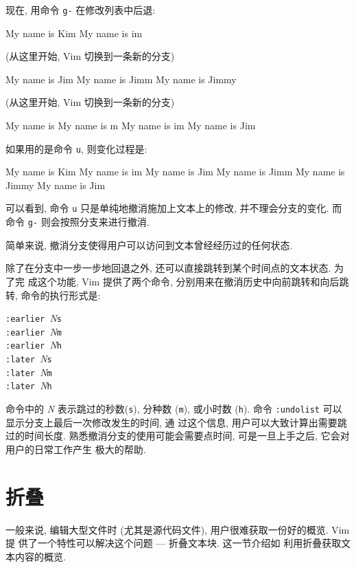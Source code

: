 现在, 用命令 \texttt{g-} 在修改列表中后退:
\begin{vimcode}
My name is Kim
My name is im
\end{vimcode}
(从这里开始, Vim 切换到一条新的分支)
\begin{vimcode}
My name is Jim
My name is Jimm
My name is Jimmy
\end{vimcode}
(从这里开始, Vim 切换到一条新的分支)
\begin{vimcode}
My name is 
My name is m
My name is im
My name is Jim
\end{vimcode}
如果用的是命令 \texttt{u}, 则变化过程是:
\begin{vimcode}
My name is Kim
My name is im
My name is Jim
My name is Jimm
My name is Jimmy
My name is Jim
\end{vimcode}
可以看到, 命令 \texttt{u} 只是单纯地撤消施加上文本上的修改, 并不理会分支的变化.
而命令 \texttt{g-} 则会按照分支来进行撤消.

简单来说, 撤消分支使得用户可以访问到文本曾经经历过的任何状态.

除了在分支中一步一步地回退之外, 还可以直接跳转到某个时间点的文本状态. 为了完
成这个功能,
Vim 提供了两个命令, 分别用来在撤消历史中向前跳转和向后跳转, 命令的执行形式是:
\begin{vimcmdform}
\texttt{:earlier }\textit{N}\texttt{s} \\
\texttt{:earlier }\textit{N}\texttt{m} \\
\texttt{:earlier }\textit{N}\texttt{h} \\
\texttt{:later }\textit{N}\texttt{s} \\
\texttt{:later }\textit{N}\texttt{m} \\
\texttt{:later }\textit{N}\texttt{h}
\end{vimcmdform}
命令中的 \textit{N} 表示跳过的秒数(\texttt{s}), 分种数 (\texttt{m}), 或小时数
(\texttt{h}). 命令 \texttt{:undolist} 可以显示分支上最后一次修改发生的时间, 通
过这个信息, 用户可以大致计算出需要跳过的时间长度.
熟悉撤消分支的使用可能会需要点时间, 可是一旦上手之后, 它会对用户的日常工作产生
极大的帮助.

\section{折叠}
\label{sec:folding}

一般来说, 编辑大型文件时 (尤其是源代码文件), 用户很难获取一份好的概览. Vim 提
供了一个特性可以解决这个问题 --- 折叠文本块. 这一节介绍如
利用折叠获取文本内容的概览.

